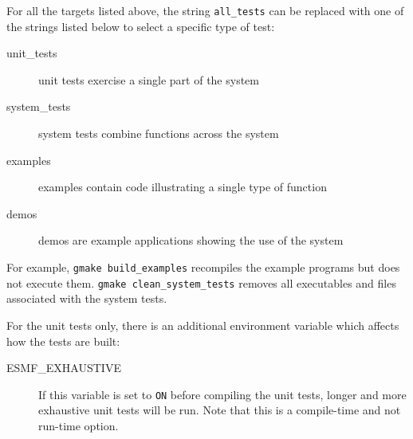 For all the targets listed above, the string {\tt all\_tests} can be
replaced with one of the strings listed below to select a
specific type of test:
\begin{description}
\item[unit\_tests] unit tests exercise a single part of the system
\item[system\_tests] system tests combine functions across the system
\item[examples] examples contain code illustrating a single type of function
\item[demos] demos are example applications showing the use of the system
\end{description}
For example, {\tt gmake build\_examples} recompiles the example programs but 
does not execute them.  {\tt gmake clean\_system\_tests} removes all
executables and files associated with the system tests.

For the unit tests only, there is an additional environment variable
which affects how the tests are built:
\begin{description}
\item[ESMF\_EXHAUSTIVE]
If this variable is set to {\tt ON} before compiling the unit tests,
longer and more exhaustive unit tests will be run.  Note that this is a
compile-time and not run-time option.
\end{description}

